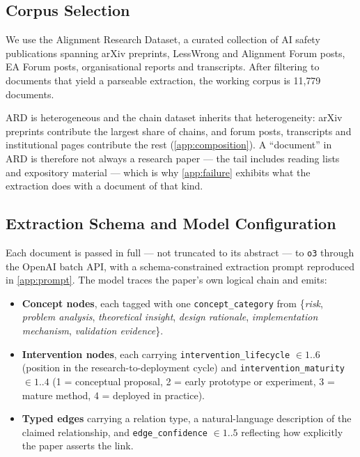 \documentclass[10pt,twocolumn,letterpaper]{article}
\begin{document}
\subsection{Corpus Selection}
\label{sec:m-corpus}

We use the Alignment Research Dataset, a curated collection of AI safety publications
spanning arXiv preprints, LessWrong and Alignment Forum posts, EA Forum posts,
organisational reports and transcripts. After filtering to documents that yield a
parseable extraction, the working corpus is 11{,}779 documents.

ARD is heterogeneous and the chain dataset inherits that heterogeneity: arXiv preprints
contribute the largest share of chains, and forum posts, transcripts and institutional
pages contribute the rest (\cref{app:composition}). A ``document'' in ARD is therefore
not always a research paper --- the tail includes reading lists and expository material
--- which is why \cref{app:failure} exhibits what the extraction does with a document of
that kind.

\subsection{Extraction Schema and Model Configuration}
\label{sec:m-extraction}

Each document is passed in full --- not truncated to its abstract --- to \texttt{o3}
through the OpenAI batch API, with a schema-constrained extraction prompt reproduced in
\cref{app:prompt}. The model traces the paper's own logical chain and emits:

\begin{itemize}
\setlength{\itemsep}{0pt}
\item \textbf{Concept nodes}, each tagged with one \texttt{concept\_category} from
\{\emph{risk}, \emph{problem analysis}, \emph{theoretical insight}, \emph{design
rationale}, \emph{implementation mechanism}, \emph{validation evidence}\}.
\item \textbf{Intervention nodes}, each carrying \texttt{intervention\_lifecycle}
$\in 1..6$ (position in the research-to-deployment cycle) and
\texttt{intervention\_maturity} $\in 1..4$ (1 = conceptual proposal, 2 = early prototype
or experiment, 3 = mature method, 4 = deployed in practice).
\item \textbf{Typed edges} carrying a relation type, a natural-language description of
the claimed relationship, and \texttt{edge\_confidence} $\in 1..5$ reflecting how
explicitly the paper asserts the link.
\end{itemize}
\end{document}
